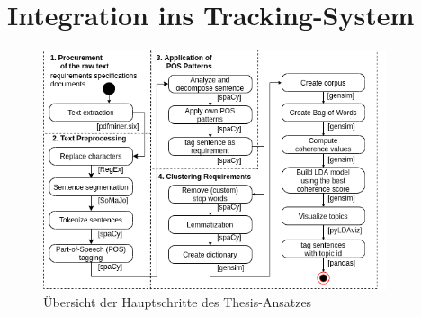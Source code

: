 \chapter{Integration ins Tracking-System}
\label{cha:implementierung}

\lipsum[3]

\begin{figure}[!ht]
    \centering
    \includegraphics[width=0.9\textwidth]{media/thesisApproach.png}
    \caption{Übersicht der Hauptschritte des Thesis-Ansatzes}
    \label{fig:thesisapproach}
\end{figure}

\lipsum[3]
